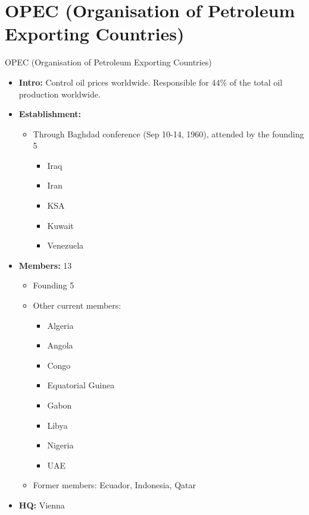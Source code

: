 \documentclass[
  12pt,
  ignorenonframetext,
  progressbar=frametitle]{beamer}
\providecommand{\tightlist}{%
  \setlength{\itemsep}{0pt}\setlength{\parskip}{0pt}}
\begin{document}
\section{OPEC (Organisation of Petroleum Exporting Countries)}
\begin{frame}[allowframebreaks]
{OPEC (Organisation of Petroleum Exporting Countries)}
\protect\hypertarget{opec-organisation-of-petroleum-exporting-countries}{}
\begin{itemize}
\tightlist
\item
  \textbf{Intro:} Control oil prices worldwide. Responsible for 44\% of
  the total oil production worldwide.
\item
  \textbf{Establishment:}

  \begin{itemize}
  \tightlist
  \item
    Through Baghdad conference (Sep 10-14, 1960), attended by the
    founding 5

    \begin{itemize}
    \tightlist
    \item
      Iraq
    \item
      Iran
    \item
      KSA
    \item
      Kuwait
    \item
      Venezuela
    \end{itemize}
  \end{itemize}
\item
  \textbf{Members:} 13

  \begin{itemize}
  \tightlist
  \item
    Founding 5
  \item
    Other current members:

    \begin{itemize}
    \tightlist
    \item
      Algeria
    \item
      Angola
    \item
      Congo
    \item
      Equatorial Guinea
    \item
      Gabon
    \item
      Libya
    \item
      Nigeria
    \item
      UAE
    \end{itemize}
  \item
    Former members: Ecuador, Indonesia, Qatar
  \end{itemize}
\item
  \textbf{HQ:} Vienna
\end{itemize}
\end{frame}
\end{document}
